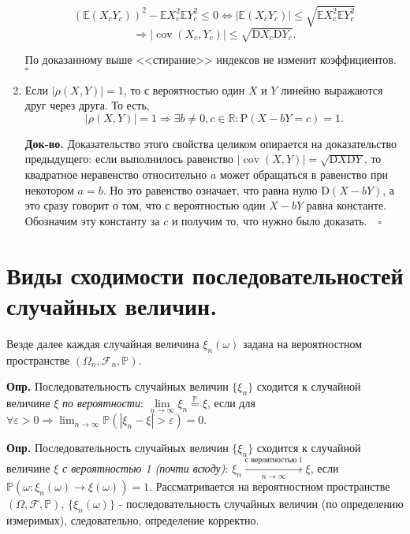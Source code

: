 \documentclass[oneside,final,14pt]{extreport}
\newcommand\mydef{{\bf Опр.}}
\newcommand\myqed{{\bf Док-во.}}
\theoremstyle{definition}
\begin{document}
\begin{enumerate}
    $$\left(\mathbb{E}\left(X_{c} Y_{c}\right)\right)^{2}-\mathbb{E} X_{c}^{2} \mathbb{E} Y_{c}^{2} \leqslant 0 \Longleftrightarrow\left|\mathbb{E}\left(X_{c} Y_{c}\right)\right| \leqslant \sqrt{\mathbb{E} X_{c}^{2} \mathbb{E} Y_{c}^{2}} $$$$\Rightarrow\left|\operatorname{cov}\left(X_{c}, Y_{c}\right)\right| \leqslant \sqrt{\mathrm{D} X_{c} \mathrm{D} Y_{c}}.$$
    
    По доказанному выше <<стирание>> индексов не изменит коэффициентов. $\square$

    \item Если $|\rho(X,Y)| = 1$, то с вероятностью один $X$ и $Y$ линейно выражаются друг через друга. То есть,
    $$|\rho(X, Y)|=1 \Longrightarrow \exists b \neq 0, c \in \mathbb{R}: \mathrm{P}(X-b Y=c)=1.$$
    
    \myqed{} Доказательство этого свойства целиком опирается на доказательство предыдущего: если выполнилось равенство $|\operatorname{cov}(X, Y)|=\sqrt{\mathrm{D} X \mathrm{D} Y}$, то квадратное неравенство относительно $a$ может обращаться в равенство при некотором $a = b$. Но это равенство означает, что равна нулю $\mathrm{D}(X-b Y)$, а это сразу говорит о том, что с вероятностью один $X - bY$ равна константе. Обозначим эту константу за $c$ и получим то, что нужно было доказать. $~~~\square$

\end{enumerate}

\section{Виды сходимости последовательностей случайных величин.}

Везде далее каждая случайная величина $\xi_n(\omega)$ задана на вероятностном пространстве $(\Omega_n,\mathcal{F}_n,\mathbb{P})$.

\mydef{} Последовательность случайных величин $\{ \xi_n \}$ сходится к случайной величине $\xi$ {\it по вероятности}: $\lim\limits_{n \to \infty} \xi_{n} \overset{\mathbb{P}}{=} \xi$, если для $\forall \varepsilon > 0 \Rightarrow \lim _{n \to \infty} \mathbb{P}\left(\left|\xi_{n}-\xi\right|>\varepsilon\right)=0.$

\mydef{} Последовательность случайных величин $\{ \xi_n \}$ сходится к случайной величине $\xi$ {\it с вероятностью 1 (почти всюду)}: $\xi_n \xrightarrow[n \rightarrow \infty]{\text{с вероятностью}~1} \xi$, если $\mathbb{P}\left(\omega: \xi_{n}(\omega) \rightarrow \xi(\omega)\right)=1$. Рассматривается на вероятностном пространстве $(\Omega, \mathcal{F}, \mathbb{P})$, $\{ \xi_n(\omega) \}$ - последовательность случайных величин (по определению измеримых), следовательно, определение корректно.
\end{document}
